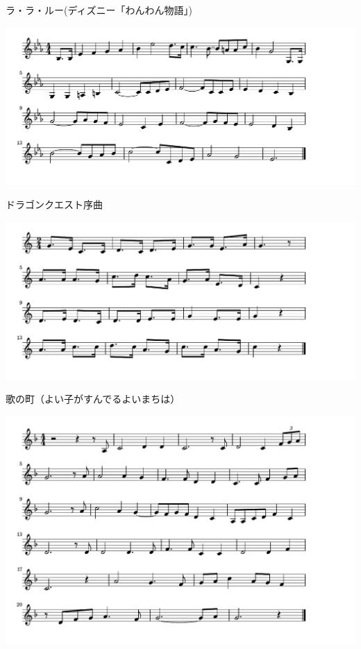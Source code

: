 \documentclass[a4paper]{ltjsarticle}
\begin{document}
\vspace{-10mm} \hspace{10mm}
ラ・ラ・ルー(ディズニー「わんわん物語」)

\includegraphics[clip]{dragonquest_crop.pdf}

\vspace{-10mm} \hspace{10mm}
ドラゴンクエスト序曲

\includegraphics[clip]{utanomachi_crop.pdf}

\vspace{-10mm} \hspace{10mm}
歌の町（よい子がすんでるよいまちは）

\includegraphics[clip]{shikararete_crop.pdf}
\end{document}
